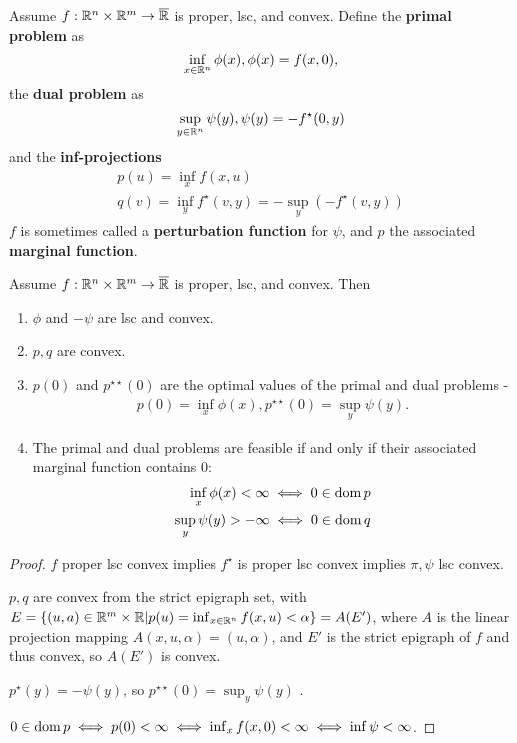 \begin{defn}
  \label{sec:duality-optimization-1}
  Assume $f: \mathbb{R}^{n} \times \mathbb{R}^{m} \rightarrow \overline {\mathbb{R}}$ is proper,
  lsc, and convex.  Define the \textbf{primal problem} as
  \begin{equation}
    \label{eq:33}
    \inf_{x \in \mathbb{R}^{n}} \phi(x), \phi(x) = f(x, 0),
  \end{equation} the \textbf{dual problem} as
  \begin{equation}
    \label{eq:34}
    \sup_{y \in \mathbb{R}^{n}} \psi(y), \psi(y) = -f^{\star}(0, y)
  \end{equation}
  and the \textbf{inf-projections}
  \begin{align}
    \label{eq:35}
    p(u) = \inf_{x} f(x, u) \\
    \label{eq:36}
    q(v) = \inf_{y} f^{\star}(v, y) = -\sup_{y} (-f^{\star}(v, y))
  \end{align}
  $f$ is sometimes called a \textbf{perturbation function} for $\psi$,
  and $p$ the associated \textbf{marginal function}.
\end{defn}

\begin{thm}
  \label{sec:duality-optimization-2}
  Assume $f: \mathbb{R}^{n} \times \mathbb{R}^{m} \rightarrow \overline {\mathbb{R}}$ is proper,
  lsc, and convex.  Then
  \begin{enumerate}
  \item $\phi$ and $-\psi$ are lsc and convex.
  \item $p, q$ are convex.
  \item $p(0)$ and $p^{\star \star}(0)$ are the optimal values of the
    primal and dual problems -
    \begin{align}
      \label{eq:37}
      p(0)  = \inf_{x} \phi(x), p^{\star \star}(0) = \sup_{y} \psi(y).
    \end{align}
  \item The primal and dual problems are feasible if and only if their
    associated marginal function contains 0:
    \begin{align}
      \label{eq:38}
      \inf_{x} \phi(x) < \infty \iff 0 \in \operatorname*{dom} p \\
      \label{eq:39}
      \sup_{y} \psi(y) > -\infty \iff 0 \in \operatorname*{dom} q
    \end{align}
  \end{enumerate}
\end{thm}

\begin{proof}
  $f$ proper lsc convex implies $f^{\star}$ is proper lsc convex
  implies $\pi, \psi$ lsc convex.

  $p, q$ are convex from the strict epigraph set, with $E = \{ (u, a)
  \in \mathbb{R}^{m } \times \mathbb{R} | p(u) = \inf_{x \in \mathbb{R}^{n}} f(x, u) < \alpha
  \} = A(E')$, where $A$ is the linear projection mapping $A(x, u,
  \alpha) = (u, \alpha)$, and $E'$ is the strict epigraph of $f$ and
  thus convex, so $A(E')$ is convex.

  $p^{\star}(y) = -\psi(y)$, so $p^{\star \star}(0) = \sup_{y} \psi(y)$ .

  $0 \in \operatorname*{dom} p \iff p(0) < \infty \iff \inf_{x} f(x, 0) < \infty \iff
  \inf \psi < \infty$.
\end{proof}

